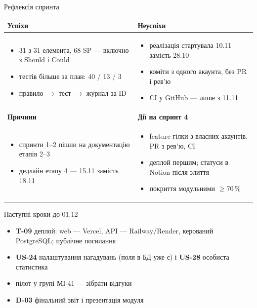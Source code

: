 \documentclass[aspectratio=169,11pt]{beamer}
\begin{document}
\begin{frame}{Рефлексія спринта}
\footnotesize
\renewcommand{\arraystretch}{1.0}
\begin{tabularx}{\textwidth}{|Y|Y|}
\hline
{}\textbf{Успіхи} & \textbf{Неуспіхи}\\
\hline
{}\begin{itemize}
  \item 31 з 31 елемента, 68 SP --- включно з Should і Could
  \item тестів більше за план: 40 / 13 / 3
  \item правило $\to$ тест $\to$ журнал за ID
\end{itemize} &
\begin{itemize}
  \item реалізація стартувала 10.11 замість 28.10
  \item коміти з одного акаунта, без PR і рев'ю
  \item CI у GitHub --- лише з 11.11
\end{itemize}\\
\hline
{}\textbf{Причини} & \textbf{Дії на спринт 4}\\
\hline
{}\begin{itemize}
  \item спринти 1--2 пішли на документацію етапів 2--3
  \item дедлайн етапу 4 --- 15.11 замість 18.11
\end{itemize} &
\begin{itemize}
  \item feature-гілки з власних акаунтів, PR з рев'ю, CI
  \item деплой першим; статуси в Notion після злиття
  \item покриття модульними $\geq$70\,\%
\end{itemize}\\
\hline
\end{tabularx}
\end{frame}

\begin{frame}{Наступні кроки до 01.12}
\begin{itemize}
  \item \textbf{T-09} деплой: web --- Vercel, API --- Railway/Render, керований PostgreSQL; публічне посилання
  \item \textbf{US-24} налаштування нагадувань (поля в БД уже є) і \textbf{US-28} особиста статистика
  \item пілот у групі МІ-41 --- зібрати відгуки
  \item \textbf{D-03} фінальний звіт і презентація модуля
\end{itemize}
\end{frame}
\end{document}
